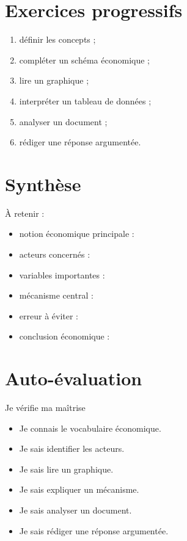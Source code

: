 \documentclass[11pt,a4paper]{article}
\begin{document}
\section{Exercices progressifs}

\begin{cadreactivite}
\begin{enumerate}
    \item définir les concepts ;
    \item compléter un schéma économique ;
    \item lire un graphique ;
    \item interpréter un tableau de données ;
    \item analyser un document ;
    \item rédiger une réponse argumentée.
\end{enumerate}
\end{cadreactivite}

\section{Synthèse}

\begin{cadresynthese}
À retenir :

\begin{itemize}
    \item notion économique principale : \dotfill
    \item acteurs concernés : \dotfill
    \item variables importantes : \dotfill
    \item mécanisme central : \dotfill
    \item erreur à éviter : \dotfill
    \item conclusion économique : \dotfill
\end{itemize}
\end{cadresynthese}

\section{Auto-évaluation}

\begin{cadregris}{Je vérifie ma maîtrise}
\begin{itemize}
    \item[$\square$] Je connais le vocabulaire économique.
    \item[$\square$] Je sais identifier les acteurs.
    \item[$\square$] Je sais lire un graphique.
    \item[$\square$] Je sais expliquer un mécanisme.
    \item[$\square$] Je sais analyser un document.
    \item[$\square$] Je sais rédiger une réponse argumentée.
\end{itemize}
\end{cadregris}
\end{document}
